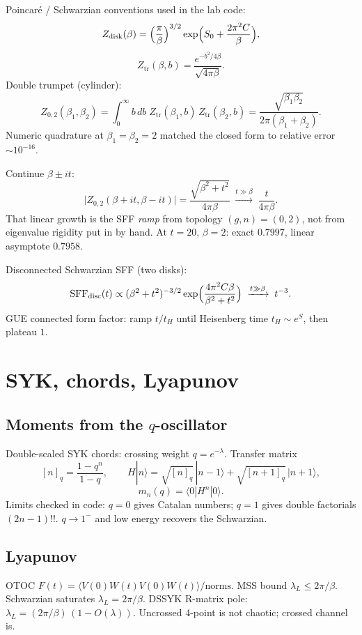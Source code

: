 \documentclass[11pt]{article}
\begin{document}
Poincar\'e / Schwarzian conventions used in the lab code:
\[
Z_{\mathrm{disk}}(\beta)=\Bigl(\frac{\pi}{\beta}\Bigr)^{3/2}\exp\Bigl(S_0+\frac{2\pi^2 C}{\beta}\Bigr),
\]
\[
Z_{\mathrm{tr}}(\beta,b)=\frac{e^{-b^2/4\beta}}{\sqrt{4\pi\beta}}.
\]
Double trumpet (cylinder):
\[
Z_{0,2}(\beta_1,\beta_2)
=\int_0^\infty b\,db\;Z_{\mathrm{tr}}(\beta_1,b)\,Z_{\mathrm{tr}}(\beta_2,b)
=\frac{\sqrt{\beta_1\beta_2}}{2\pi(\beta_1+\beta_2)}.
\]
Numeric quadrature at $\beta_1=\beta_2=2$ matched the closed form to relative error $\sim 10^{-16}$.

Continue $\beta\pm it$:
\[
\bigl|Z_{0,2}(\beta+it,\beta-it)\bigr|
=\frac{\sqrt{\beta^2+t^2}}{4\pi\beta}
\;\xrightarrow{t\gg\beta}\;
\frac{t}{4\pi\beta}.
\]
That linear growth is the SFF \emph{ramp} from topology $(g,n)=(0,2)$, not from eigenvalue rigidity put in by hand. At $t=20$, $\beta=2$: exact $0.7997$, linear asymptote $0.7958$.

Disconnected Schwarzian SFF (two disks):
\[
\mathrm{SFF}_{\mathrm{disc}}(t)
\propto (\beta^2+t^2)^{-3/2}
\exp\Bigl(\frac{4\pi^2 C\beta}{\beta^2+t^2}\Bigr)
\;\xrightarrow{t\gg\beta}\; t^{-3}.
\]
GUE connected form factor: ramp $t/t_H$ until Heisenberg time $t_H\sim e^{S}$, then plateau $1$.

\section{SYK, chords, Lyapunov}

\subsection{Moments from the $q$-oscillator}
Double-scaled SYK chords: crossing weight $q=e^{-\lambda}$. Transfer matrix
\[
[n]_q=\frac{1-q^n}{1-q},
\qquad
H|n\rangle=\sqrt{[n]_q}\,|n-1\rangle+\sqrt{[n+1]_q}\,|n+1\rangle,
\]
\[
m_n(q)=\langle 0|H^n|0\rangle.
\]
Limits checked in code: $q=0$ gives Catalan numbers; $q=1$ gives double factorials $(2n-1)!!$. $q\to 1^-$ and low energy recovers the Schwarzian.

\subsection{Lyapunov}
OTOC $F(t)=\langle V(0)W(t)V(0)W(t)\rangle/\mathrm{norms}$. MSS bound $\lambda_L\le 2\pi/\beta$. Schwarzian saturates $\lambda_L=2\pi/\beta$. DSSYK R-matrix pole: $\lambda_L=(2\pi/\beta)\,(1-O(\lambda))$. Uncrossed 4-point is not chaotic; crossed channel is.
\end{document}
